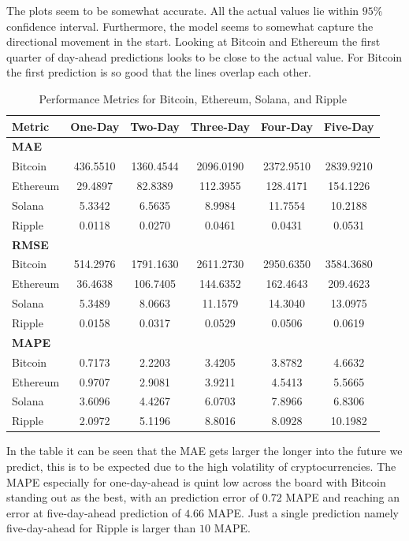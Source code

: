 \noindent The plots seem to be somewhat accurate. All the actual values lie within $95\%$ confidence interval. Furthermore, the model seems to somewhat capture the directional movement in the start. Looking at Bitcoin and Ethereum the first quarter of day-ahead predictions looks to be close to the actual value. For Bitcoin the first prediction is so good that the lines overlap each other.
\begin{table}[H]
\centering
\begin{tabular}{lccccc}
\toprule
\textbf{Metric} & \textbf{One-Day} & \textbf{Two-Day} & \textbf{Three-Day} & \textbf{Four-Day} & \textbf{Five-Day} \\
\midrule
\textbf{MAE} & & & & & \\
Bitcoin   & 436.5510 & 1360.4544 & 2096.0190 & 2372.9510 & 2839.9210 \\
Ethereum  &  29.4897 &   82.8389 &  112.3955 &  128.4171 &  154.1226 \\
Solana    &   5.3342 &    6.5635 &    8.9984 &   11.7554 &   10.2188 \\
Ripple    &   0.0118 &    0.0270 &    0.0461 &    0.0431 &    0.0531 \\
\midrule
\textbf{RMSE} & & & & & \\
Bitcoin   & 514.2976 & 1791.1630 & 2611.2730 & 2950.6350 & 3584.3680 \\
Ethereum  &  36.4638 &  106.7405 &  144.6352 &  162.4643 &  209.4623 \\
Solana    &   5.3489 &    8.0663 &   11.1579 &   14.3040 &   13.0975 \\
Ripple    &   0.0158 &    0.0317 &    0.0529 &    0.0506 &    0.0619 \\
\midrule
\textbf{MAPE} & & & & & \\
Bitcoin   &   0.7173 &    2.2203 &    3.4205 &    3.8782 &    4.6632 \\
Ethereum  &   0.9707 &    2.9081 &    3.9211 &    4.5413 &    5.5665 \\
Solana    &   3.6096 &    4.4267 &    6.0703 &    7.8966 &    6.8306 \\
Ripple    &   2.0972 &    5.1196 &    8.8016 &    8.0928 &   10.1982 \\
\bottomrule
\end{tabular}
\caption{Performance Metrics for Bitcoin, Ethereum, Solana, and Ripple}
\label{fig:johansen_RMSE_MAE_MAPE}
\end{table}
\noindent In the table it can be seen that the MAE gets larger the longer into the future we predict, this is to be expected due to the high volatility of cryptocurrencies. The MAPE especially for one-day-ahead is quint low across the board with Bitcoin standing out as the best, with an prediction error of $0.72$ MAPE and reaching an error at five-day-ahead prediction of $4.66$ MAPE. Just a single prediction namely five-day-ahead for Ripple is larger than $10$ MAPE.\\


